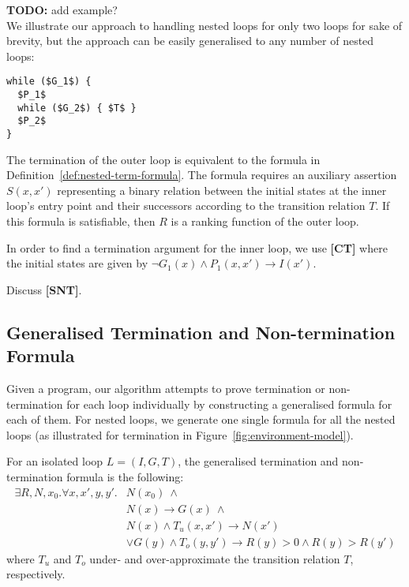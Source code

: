 \documentclass[preprint]{sigplanconf}
\theoremstyle{definition}
\newcommand{\todo}[1]{{\bf TODO:} #1}
\begin{document}
\todo{add example?}\\

%
We illustrate our approach to handling nested loops for only two loops for
sake of brevity, but the approach can be easily generalised to any number of
nested loops:
%
\begin{lstlisting}[mathescape=true]
while ($G_1$) { 
  $P_1$ 
  while ($G_2$) { $T$ }
  $P_2$
}
\end{lstlisting}

The termination of the outer loop is equivalent to the formula in
Definition~\ref{def:nested-term-formula}.  The formula requires an auxiliary
assertion $S(x,x')$ representing a binary relation between the initial
states at the inner loop's entry point and their successors according to the
transition relation $T$.  If this formula is satisfiable, then $R$ is a
ranking function of the outer loop.

In order to find a termination argument for the inner loop, we use {\bf [CT]} where the initial states are given by 
$\neg G_1(x) \wedge P_1(x,x') \rightarrow I(x')$.


Discuss {\bf [SNT]}.\\

\fi

\subsection{Generalised Termination and Non-termination Formula} 
Given a program, our algorithm attempts to prove termination or non-termination for each loop individually 
by constructing a generalised formula for each of them.
For nested loops, we generate one single formula for all the nested loops (as illustrated for termination in Figure~\ref{fig:environment-model}).

For an isolated loop $L=(I,G,T)$, the generalised termination and non-termination formula is the following:
%
 \begin{align*}
  \exists R, N, x_0 . \forall x, x',y,y' . & N(x_0) ~ \wedge \\ & N(x) \rightarrow G(x) ~ \wedge \\
							& N(x) \wedge T_u(x, x') \rightarrow N(x')\\
  & \vee G(y) \wedge T_o(y, y') \rightarrow  R(y){>}0 \wedge R(y){>}R(y')
 \end{align*}
%
%
where $T_u$ and $T_o$ under- and over-approximate the transition relation $T$, respectively.
\end{document}
